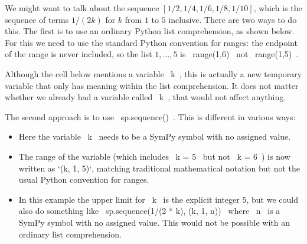 \documentclass[a4paper,10pt]{amsbook}
\begin{document}
\begin{secenum}
%
\item\label{seq} We might want to talk about the sequence
 $[1/2, 1/4, 1/6, 1/8, 1/10]$, which is the sequence of terms $1/(2k)$
 for $k$ from $1$ to $5$ inclusive.  There are two ways to do this.
 The first is to use an ordinary Python list comprehension, as shown
 below.  For this we need to use the standard Python convention for
 ranges: the endpoint of the range is never included, so the list
 $1,\dotsc,5$ is \pcode~range(1,6)~ not \pcode~range(1,5)~.

 Although the cell below mentions a variable \pcode~k~, this is actually a
 new temporary variable that only has meaning within the list
 comprehension.  It does not matter whether we already had a variable
 called \pcode~k~, that would not affect anything.  
 \begin{pcodeblock}
 \end{pcodeblock}

 The second approach is to use \pcode~sp.sequence()~.  This is different in
 various ways:
 \begin{itemize}
  \item Here the variable \pcode~k~ needs to be a SymPy symbol with no
   assigned value.  
  \item The range of the variable (which includes \pcode~k = 5~ but
   not \pcode~k = 6~) is now written as `(k, 1, 5)`, matching
   traditional mathematical notation but not the usual Python
   convention for ranges. 
  \item In this example the upper limit for \pcode~k~ is the explicit
   integer $5$, but we could also do something like 
   \pcode~sp.sequence(1/(2 * k), (k, 1, n))~ where \pcode~n~ is a
   SymPy symbol with no assigned value.  This would not be possible
   with an ordinary list comprehension. 
 \end{itemize}


\end{secenum}
\end{document}
